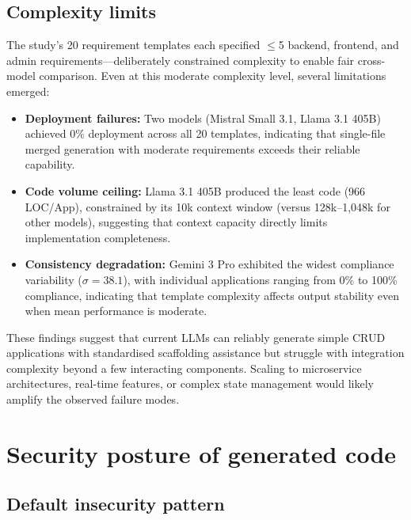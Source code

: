\subsection{Complexity limits}

The study's 20 requirement templates each specified $\leq$5 backend, frontend, and admin requirements---deliberately constrained complexity to enable fair cross-model comparison. Even at this moderate complexity level, several limitations emerged:

\begin{itemize}
    \item \textbf{Deployment failures:} Two models (Mistral Small 3.1, Llama 3.1 405B) achieved 0\% deployment across all 20 templates, indicating that single-file merged generation with moderate requirements exceeds their reliable capability.
    \item \textbf{Code volume ceiling:} Llama 3.1 405B produced the least code (966 LOC/App), constrained by its 10k context window (versus 128k--1{,}048k for other models), suggesting that context capacity directly limits implementation completeness.
    \item \textbf{Consistency degradation:} Gemini 3 Pro exhibited the widest compliance variability ($\sigma = 38.1$), with individual applications ranging from 0\% to 100\% compliance, indicating that template complexity affects output stability even when mean performance is moderate.
\end{itemize}

These findings suggest that current LLMs can reliably generate simple CRUD applications with standardised scaffolding assistance but struggle with integration complexity beyond a few interacting components. Scaling to microservice architectures, real-time features, or complex state management would likely amplify the observed failure modes.

\section{Security posture of generated code}
\label{sec:security_posture}

\subsection{Default insecurity pattern}

